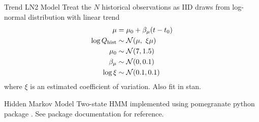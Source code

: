 \documentclass[
  10pt,     %
]{beamer}
\newcommand{\normal}{\mathcal{N}}
\begin{document}
\begin{frame}{Trend LN2 Model}
  Treat the $N$ historical observations as IID draws from log-normal distribution with linear trend
  \begin{align}\label{eq:ln2-trend}
    \begin{split}
      \mu &= \mu_0 + \beta_\mu \qty(t - t_0) \\
    \log Q_\text{hist} & \sim \normal \qty(\mu, \ \xi \mu) \\
    \mu_0 & \sim \normal \qty(7, 1.5) \\
    \beta_\mu & \sim \normal \qty(0, 0.1) \\
    \log \xi & \sim \normal \qty(0.1, 0.1)
    \end{split}
  \end{align}
  where $\xi$ is an estimated coefficient of variation.
  Also fit in stan.
\end{frame}

\begin{frame}{Hidden Markov Model}
  Two-state HMM \citep[see][]{Rabiner:1986jk} implemented using pomegranate python package \citep{Schreiber:2017tg}.
  See package documentation for reference.
\end{frame}
\end{document}

